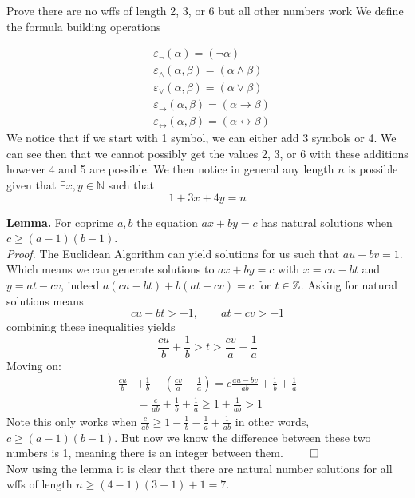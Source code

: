 
\def\name{Daniel Tobias}
\def\assignment{Introduction to Mathematical Logic}


\begin{problem}{1}{Prove there are no wffs of length 2, 3, or 6 but all other numbers work}
        We define the formula building operations

\begin{align}
    &\varepsilon_{\lnot}(\alpha) = (\lnot \alpha)\\
    &\varepsilon_{\land}(\alpha,\beta) = (\alpha \land \beta)\\
    &\varepsilon_{\lor}(\alpha, \beta) = (\alpha \lor \beta)\\
    &\varepsilon_{\rightarrow}(\alpha,\beta) = (\alpha \to \beta)\\
    &\varepsilon_{\leftrightarrow}(\alpha, \beta) = (\alpha \leftrightarrow \beta) 
\end{align}
We notice that if we start with 1 symbol, we can either add 3 symbols or 4. We can see then that we cannot possibly get the
values 2, 3, or 6 with these additions however 4 and 5 are possible. We then notice in general any length $n$ is possible given that $\exists x,y \in \mathbb{N}$ such that 
$$1 + 3x + 4y = n$$

\textbf{Lemma.} For coprime $a,b$ the equation $ax + by = c$ has natural solutions when $c \ge (a-1)(b-1)$.\\

\textit{Proof.} The Euclidean Algorithm can yield solutions for us such that $au -bv = 1$. Which means we can generate solutions to $ax + by = c$ with
$x = cu -bt$ and $y=at-cv$, indeed $a(cu-bt) + b(at-cv) = c$ for $t \in \mathbb{Z}$. Asking for
natural solutions means $$cu-bt > -1, \quad\quad at - cv > -1 $$
combining these inequalities yields $$\frac{cu}{b} + \frac{1}{b} > t > \frac{cv}{a} - \frac{1}{a}$$
Moving on:
\begin{align*}
    \frac{cu}{b} &+ \frac{1}{b} - \left(\frac{cv}{a} - \frac{1}{a}\right) = c \frac{au-bv}{ab} + \frac{1}{b} + \frac{1}{a}\\
    &= \frac{c}{ab} + \frac{1}{b} + \frac{1}{a} \ge 1 + \frac{1}{ab} > 1
\end{align*}
Note this only works when $\frac{c}{ab} \ge 1 - \frac{1}{b}-\frac{1}{a} + \frac{1}{ab}$ in other words, $c \ge (a-1)(b-1)$. But now we know the difference between these two numbers
is 1, meaning there is an integer between them. $\qed$\\

Now using the lemma it is clear that there are natural number solutions for all wffs of length $n \ge (4-1)(3-1) +1 = 7$.
\end{problem}

